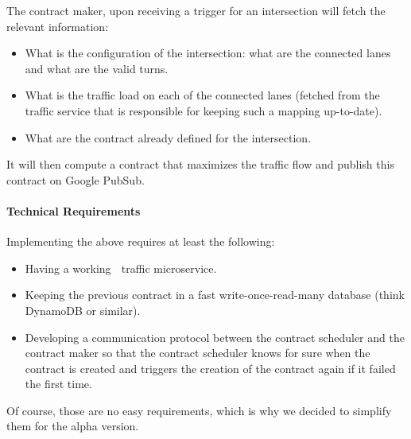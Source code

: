 \documentclass[letterpaper,10pt,english]{sphinxmanual}
\begin{document}
The contract maker, upon receiving a trigger for an intersection will fetch the relevant information:
\begin{itemize}
\item {} 
What is the configuration of the intersection: what are the connected lanes and what are the valid turns.

\item {} 
What is the traffic load on each of the connected lanes (fetched from the 🚗 traffic service that is responsible for keeping such a mapping up-to-date).

\item {} 
What are the contract already defined for the intersection.

\end{itemize}

It will then compute a contract that maximizes the traffic flow and publish this contract on Google PubSub.


\paragraph{Technical Requirements}
\label{\detokenize{blog/2020/01/contract_maker_vs_contract_scheduler:technical-requirements}}
Implementing the above requires at least the following:
\begin{itemize}
\item {} 
Having a working 🚗 traffic microservice.

\item {} 
Keeping the previous contract in a fast write-once-read-many database (think DynamoDB or similar).

\item {} 
Developing a communication protocol between the contract scheduler and the contract maker so that the contract scheduler knows for sure when the contract is created and triggers the creation of the contract again if it failed the first time.

\end{itemize}

Of course, those are no easy requirements, which is why we decided to simplify them for the alpha version.
\end{document}
